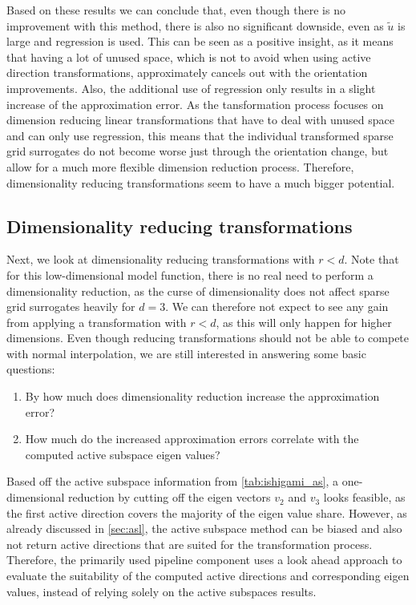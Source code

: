 \documentclass[
  a4paper,  %
  twoside,  %
  bibliography=totoc,
  headsepline,
  cleardoublepage=empty,
  parskip=half,
  draft=false
]{scrbook}
\begin{document}
Based on these results we can conclude that, even though there is no improvement with this method, there is also no significant downside, even as $\tilde{u}$ is large and regression is used.
This can be seen as a positive insight, as it means that having a lot of unused space, which is not to avoid when using active direction transformations, approximately cancels out with the orientation improvements.
Also, the additional use of regression only results in a slight increase of the approximation error.
As the tansformation process focuses on dimension reducing linear transformations that have to deal with unused space and can only use regression, this means that the individual transformed sparse grid surrogates do not become worse just through the orientation change, but allow for a much more flexible dimension reduction process.
Therefore, dimensionality reducing transformations seem to have a much bigger potential.

\subsection{Dimensionality reducing transformations}

Next, we look at dimensionality reducing transformations with $r < d$.
Note that for this low-dimensional model function, there is no real need to perform a dimensionality reduction, as the curse of dimensionality does not affect sparse grid surrogates heavily for $d=3$.
We can therefore not expect to see any gain from applying a transformation with $r < d$, as this will only happen for higher dimensions.
Even though reducing transformations should not be able to compete with normal interpolation, we are still interested in answering some basic questions:
\begin{enumerate}
\item By how much does dimensionality reduction increase the approximation error?
\item How much do the increased approximation errors correlate with the computed active subspace eigen values?
\end{enumerate}
%
Based off the active subspace information from \cref{tab:ishigami_as}, a one-dimensional reduction by cutting off the eigen vectors $v_2$ and $v_3$ looks feasible, as the first active direction covers the majority of the eigen value share.
However, as already discussed in \cref{sec:asl}, the active subspace method can be biased and also not return active directions that are suited for the transformation process.
Therefore, the primarily used pipeline component uses a look ahead approach to evaluate the suitability of the computed active directions and corresponding eigen values, instead of relying solely on the active subspaces results.
\end{document}
